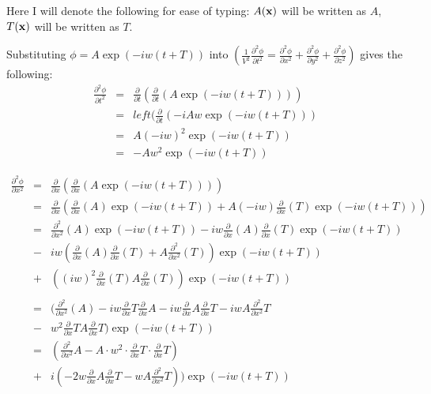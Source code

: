 \documentclass{mm2}
\begin{document}
\begin{answer}{2}
Here I will denote the following for ease of typing:
$A({\bf x})$ will be written as $A$,
$T({\bf x})$ will be written as $T$.

Substituting $\phi = A\exp(-iw(t + T))$ into $\left( \frac{1}{V^2}\frac{\partial^2 \phi}{\partial t^2}=\frac{\partial^2 \phi}{\partial x^2}+\frac{\partial^2 \phi}{\partial y^2}+
\frac{\partial^2 \phi}{\partial z^2}\right)$ gives the following:
\begin{eqnarray}
\frac{\partial ^2 \phi}{\partial t^2} &=& \frac{\partial}{\partial t} \left( \frac{\partial}{\partial t} \left( A\exp(-iw(t + T)) \right) \right)\\ &=& left( \frac{\partial}{\partial t} \left( -iAw\exp(-iw(t + T)) \right)\\ &=&  A(-iw)^2\exp(-iw(t + T))\\ &=&  -Aw^2\exp(-iw(t + T)) 
\end{eqnarray}

\begin{eqnarray}
\frac{\partial ^2 \phi}{\partial x^2} &=& \frac{\partial}{\partial x} \left( \frac{\partial}{\partial x} \left( A\exp(-iw(t + T)) \right) \right)\\  &=& \frac{\partial}{\partial x}\left( \frac{\partial}{\partial x}\left(A\right)\exp(-iw(t + T)) + A(-iw)\frac{\partial}{\partial x}(T)\exp(-iw(t + T))\right)\\ &=& \frac{\partial^2}{\partial x^2}\left(A\right)\exp(-iw(t + T)) - iw\frac{\partial}{\partial x}(A)\frac{\partial}{\partial x}(T)\exp(-iw(t + T))\\ &-& iw\left(\frac{\partial}{\partial x}\left(A\right)\frac{\partial}{\partial x}\left(T\right) + A \frac{\partial^2}{\partial x^2}\left(T\right)\right)\exp(-iw(t + T))\\ &+& ((iw)^2 \frac{\partial}{\partial x}(T)A\frac{\partial}{\partial x}(T))\exp(-iw(t + T)) \\ \\
&=& (\frac{\partial^2}{\partial x^2}(A) -iw\frac{\partial}{\partial x} T \frac{\partial}{\partial x} A-iw \frac{\partial}{\partial x}A \frac{\partial}{\partial x}T - iwA\frac{\partial^2}{\partial x^2}T\\ &-& w^2 \frac{\partial}{\partial x}TA\frac{\partial}{\partial x}T)\exp(-iw(t + T)) \\
&=&(\frac{\partial^2}{\partial x^2} A - A \cdot w^2 \cdot \frac{\partial }{\partial x}T \cdot \frac{\partial}{\partial x}T)\\ &+& i (-2w\frac{\partial }{\partial x}A\frac{\partial}{\partial x}T-wA\frac{\partial^2}{\partial x^2}T))\exp(-iw(t + T))
\end{eqnarray}


\end{answer}
\end{document}

